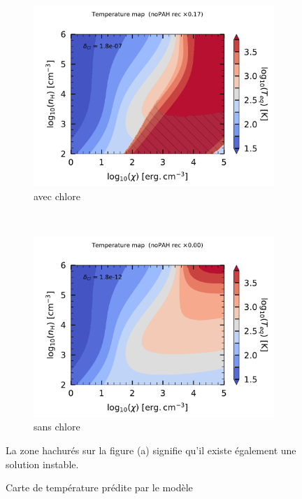 \begin{figure}[!h]
    \centering
    \begin{subfigure}[t]{0.49\textwidth} %
        \centering \includegraphics[trim = {0 0 0 1cm},clip,width=1\textwidth]{figure/Cl/gridModel/mapG0nHTeq_m6p7_imp_noPAH_3p0PE_OI_CII_ggr_elecrec_lyman_OI.pdf}
        \caption{avec chlore}
    \end{subfigure}
    ~ 
    \begin{subfigure}[t]{0.49\textwidth}
        \centering \includegraphics[trim = {0 0 0 1cm},clip,width=1\textwidth]{figure/Cl/gridModel/mapG0nHTeq_m11p7_exp_noPAH_3p0PE_OI_CII_ggr_elecrec_lyman_OI.pdf}
        \caption{sans chlore}
    \end{subfigure}
    \caption{Carte de température prédite par le modèle}
     \begin{minipage}{\textwidth} 
     La zone hachurés sur la figure (a) signifie qu'il existe également une solution instable.
     \label{fig:Cl:gridModel:Tba:noCl}
     \end{minipage}
    \label{fig:Cl:gridModel:Tba}
\end{figure}


